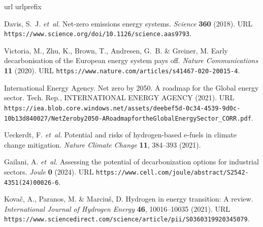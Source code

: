 \documentclass[5p,numafflabel]{elsarticle}
\begin{document}
\renewcommand{\ttdefault}{\sfdefault}
\begin{thebibliography}{10}
\expandafter\ifx\csname url\endcsname\relax
  \def\url#1{\texttt{#1}}\fi
\expandafter\ifx\csname urlprefix\endcsname\relax\def\urlprefix{URL }\fi
\providecommand{\bibinfo}[2]{#2}
\providecommand{\eprint}[2][]{\url{#2}}

\bibinfo{author}{Davis, S.~J.} \emph{et~al.}
\newblock \bibinfo{title}{Net-zero emissions energy systems}.
\newblock \emph{\bibinfo{journal}{Science}} \textbf{\bibinfo{volume}{360}}
  (\bibinfo{year}{2018}).
\newblock \urlprefix\url{https://www.science.org/doi/10.1126/science.aas9793}.

\bibinfo{author}{Victoria, M.}, \bibinfo{author}{Zhu, K.},
  \bibinfo{author}{Brown, T.}, \bibinfo{author}{Andresen, G.~B.} \&
  \bibinfo{author}{Greiner, M.}
\newblock \bibinfo{title}{Early decarbonisation of the {{European}} energy
  system pays off}.
\newblock \emph{\bibinfo{journal}{Nature Communications}}
  \textbf{\bibinfo{volume}{11}} (\bibinfo{year}{2020}).
\newblock \urlprefix\url{https://www.nature.com/articles/s41467-020-20015-4}.

\bibinfo{author}{{International Energy Agency}}.
\newblock \bibinfo{title}{Net zero by 2050. {{A}} roadmap for the {{Global}}
  energy sector}.
\newblock \bibinfo{type}{Tech. Rep.}, \bibinfo{institution}{INTERNATIONAL
  ENERGY AGENCY} (\bibinfo{year}{2021}).
\newblock
  \urlprefix\url{https://iea.blob.core.windows.net/assets/deebef5d-0c34-4539-9d0c-10b13d840027/NetZeroby2050-ARoadmapfortheGlobalEnergySector_CORR.pdf}.

\bibinfo{author}{Ueckerdt, F.} \emph{et~al.}
\newblock \bibinfo{title}{Potential and risks of hydrogen-based e-fuels in
  climate change mitigation}.
\newblock \emph{\bibinfo{journal}{Nature Climate Change}}
  \textbf{\bibinfo{volume}{11}}, \bibinfo{pages}{384--393}
  (\bibinfo{year}{2021}).

\bibinfo{author}{Gailani, A.} \emph{et~al.}
\newblock \bibinfo{title}{Assessing the potential of decarbonization options
  for industrial sectors}.
\newblock \emph{\bibinfo{journal}{Joule}} \textbf{\bibinfo{volume}{0}}
  (\bibinfo{year}{2024}).
\newblock
  \urlprefix\url{https://www.cell.com/joule/abstract/S2542-4351(24)00026-6}.

\bibinfo{author}{Kova{\v c}, A.}, \bibinfo{author}{Paranos, M.} \&
  \bibinfo{author}{Marciu{\v s}, D.}
\newblock \bibinfo{title}{Hydrogen in energy transition: {{A}} review}.
\newblock \emph{\bibinfo{journal}{International Journal of Hydrogen Energy}}
  \textbf{\bibinfo{volume}{46}}, \bibinfo{pages}{10016--10035}
  (\bibinfo{year}{2021}).
\newblock
  \urlprefix\url{https://www.sciencedirect.com/science/article/pii/S0360319920345079}.


\end{thebibliography}
\end{document}
